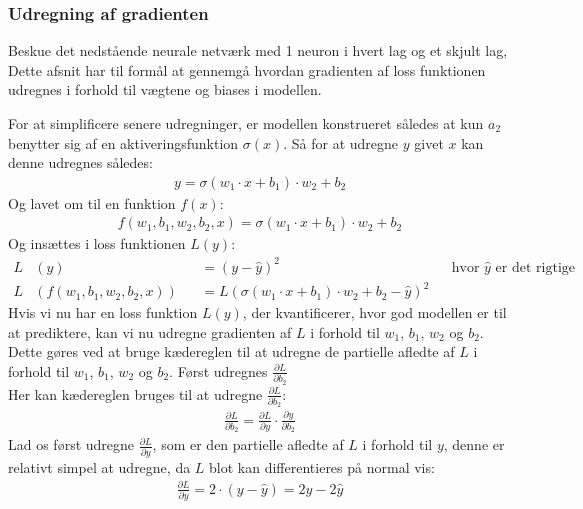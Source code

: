 \documentclass{article}
\begin{document}
\subsubsection{Udregning af gradienten}
Beskue det nedstående neurale netværk med 1 neuron i hvert lag og et skjult lag, Dette afsnit har til formål at gennemgå hvordan gradienten af loss funktionen udregnes i forhold til vægtene og biases i modellen.
\begin{center}
  
  \label{fig:neural_network3}
\end{center}
For at simplificere senere udregninger, er modellen konstrueret således at kun $a_2$ benytter sig af en aktiveringsfunktion $\sigma(x)$. Så for at udregne $y$ givet $x$ kan denne udregnes således:
\begin{align}
  y= \sigma(w_1 \cdot x + b_1) \cdot w_2 + b_2  
\end{align}
Og lavet om til en funktion $f(x)$:
\begin{align}
  f(w_1, b_1, w_2, b_2, x) = \sigma(w_1 \cdot x + b_1) \cdot w_2 + b_2
\end{align}
Og insættes i loss funktionen $L(y)$:
\begin{align}
  L&(y) &&= (y - \hat{y})^2 && \text{hvor } \hat{y} \text{ er det rigtige svar}\\
  L&(f(w_1, b_1, w_2, b_2, x)) &&= L(\sigma(w_1 \cdot x + b_1) \cdot w_2 + b_2 - \hat{y})^2
  \label{eq:full_loss}
\end{align}
Hvis vi nu har en loss funktion $L(y)$, der kvantificerer, hvor god modellen er til at prediktere, kan vi nu udregne gradienten af $L$ i forhold til $w_1$, $b_1$, $w_2$ og $b_2$. Dette gøres ved at bruge kædereglen til at udregne de partielle afledte af $L$ i forhold til $w_1$, $b_1$, $w_2$ og $b_2$. Først udregnes $\frac{\partial L}{\partial b_2}$\\
Her kan kædereglen bruges til at udregne $\frac{\partial L}{\partial b_2}$:
\begin{align}
  \frac{\partial L}{\partial b_2} = \frac{\partial L}{\partial y} \cdot \frac{\partial y}{\partial b_2}
\end{align}
Lad os først udregne $\frac{\partial L}{\partial y}$, som er den partielle afledte af $L$ i forhold til $y$, denne er relativt simpel at udregne, da $L$ blot kan differentieres på normal vis:
\begin{align}
  \frac{\partial L}{\partial y} = 2 \cdot (y - \hat{y}) = 2y - 2\hat{y}
\end{align}
\end{document}
